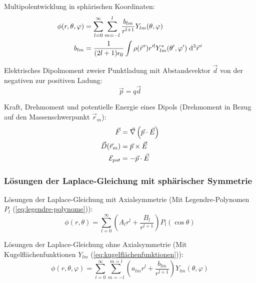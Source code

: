 \documentclass[11pt]{article}
\numberwithin{equation}{section}
\begin{document}
				\noindent
				Multipolentwicklung in sphärischen Koordinaten:
				\begin{equation}
					\begin{aligned}
						\phi(r,\theta,\varphi) &= \sum_{l=0}^{\infty}\sum_{m=-l}^{l} \frac{b_{lm}}{r^{l+1}}Y_{lm}(\theta,\varphi) \\
						b_{lm} &= \frac{1}{(2l+1)\epsilon_0}\int\rho(\pvec{r}')r'^lY^{*}_{lm}(\theta',\varphi')\;\diff^3\pvec{r}'
					\end{aligned}
				\end{equation}

				\noindent
				Elektrisches Dipolmoment zweier Punktladung mit Abstandsvektor $\vec{d}$ von der negativen zur positiven Ladung:
				\begin{equation}
					\vec{p}=q\vec{d}
				\end{equation}

				\noindent
				Kraft, Drehmoment und potentielle Energie eines Dipols (Drehmoment in Bezug auf den Massenschwerpunkt $\vec{r}_m$):
				\begin{equation}
					\begin{aligned}
						\vec{F} &= \vec{\nabla}\left(\vec{p}\cdot\vec{E}\right) \\
						\vec{D}(\vec{r}_m) &= \vec{p}\times\vec{E} \\
						\mathcal{E}_{pot} &= -\vec{p}\cdot\vec{E} \\
					\end{aligned}
				\end{equation}

			\subsubsection{Lösungen der Laplace-Gleichung mit sphärischer Symmetrie}
				\noindent
				Lösungen der Laplace-Gleichung mit Axialsymmetrie (Mit Legendre-Polynomen $P_l$ (\ref{eq:legendre-polynome})):
				\begin{equation}
					\phi(r,\theta)=\sum_{l=0}^\infty \left(A_l r^l + \frac{B_l}{r^{l+1}}\right)P_l(\cos\theta)
				\end{equation}

				\noindent
				Lösungen der Laplace-Gleichung ohne Axialsymmetrie (Mit Kugelflächenfunktionen $Y_{lm}$ (\ref{eq:kugelflächenfunktionen})):
				\begin{equation}
					\phi(r,\theta,\varphi) = \sum_{l=0}^{\infty}\sum_{m=-l}^{m=l} \left(a_{lm} r^l + \frac{b_{lm}}{r^{l+1}}\right) Y_{lm}(\theta, \varphi)
				\end{equation}
\end{document}
